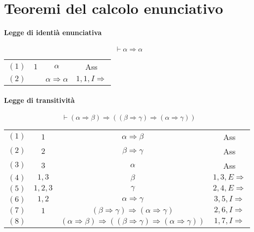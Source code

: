 \chapter{Teoremi del calcolo enunciativo}
\subsubsection{Legge di identi\`a enunciativa}
\begin{equation}
\vdash\alpha\Rightarrow\alpha
\end{equation}
\begin{tabular}{c c c c}
$(1)$& $1$ & $\alpha$ & Ass\\
$(2)$& & $\alpha\Rightarrow\alpha$ & $1,1,I\Rightarrow$
\end{tabular}
\subsubsection{Legge di transitivit\`a}
\begin{equation}
\vdash (\alpha\Rightarrow\beta)\Rightarrow ((\beta\Rightarrow\gamma)\Rightarrow(\alpha\Rightarrow\gamma))
\end{equation}
\begin{tabular}{c c c c}
$(1)$& $1$ & $\alpha\Rightarrow\beta$ & Ass\\
$(2)$& $2$ & $\beta\Rightarrow\gamma$ & Ass\\
$(3)$ & $3$ & $\alpha$& Ass\\
$(4)$ & $1, 3$ & $\beta$ & $1,3, E\Rightarrow$\\
$(5)$ &$1,2,3$ & $\gamma$ & $2,4,E\Rightarrow$\\
$(6)$ & $1, 2$ & $\alpha\Rightarrow\gamma$ & $3, 5, I\Rightarrow$\\
$(7)$ & $1$ & $(\beta\Rightarrow\gamma)\Rightarrow(\alpha\Rightarrow\gamma)$ & $2, 6, I\Rightarrow$\\
$(8)$ & & $(\alpha\Rightarrow\beta)\Rightarrow((\beta\Rightarrow\gamma)\Rightarrow(\alpha\Rightarrow\gamma))$ & $1, 7, I\Rightarrow$
\end{tabular}
